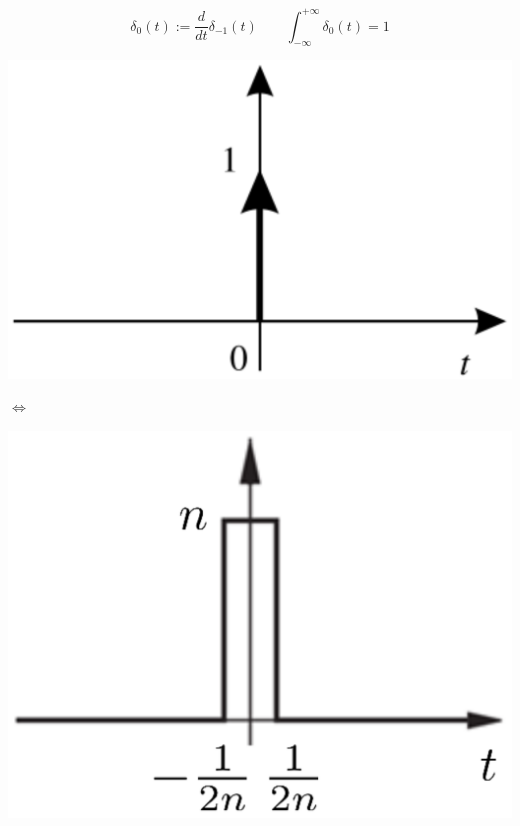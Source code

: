 \documentclass[a4paper]{article}
\begin{document}
\begin{center}
	\begin{minipage}{0.45\textwidth}
		\[\delta_0(t) := \frac{d}{dt}\delta_{-1}(t) \qquad \int_{-\infty}^{+\infty} \delta_0(t) = 1\]
	\end{minipage}
	\begin{minipage}{0.2\textwidth}
		\centering
		\includegraphics[width=\textwidth]{dirac1.png}
	\end{minipage}
	\begin{minipage}{0.05\textwidth}
		\centering
		\(\Leftrightarrow\)
	\end{minipage}
	\begin{minipage}{0.2\textwidth}
		\centering
		\includegraphics[width=\textwidth]{dirac2.png}
	\end{minipage}
\end{center}
\end{document}
